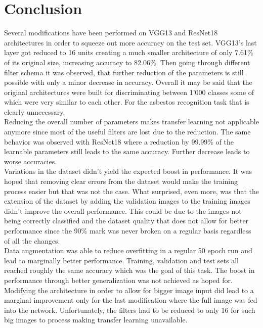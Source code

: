 \section{Conclusion}

Several modifications have been performed on VGG13 and ResNet18 architectures in order to squeeze out more accuracy on the test set. VGG13's last layer got reduced to 16 units creating a much smaller architecture of only 7.61\% of its original size, increasing accuracy to 82.06\%. Then going through different filter schema it was observed, that further reduction of the parameters is still possible with only a minor decrease in accuracy. Overall it may be said that the original architectures were built for discriminating between 1'000 classes some of which were very similar to each other. For the asbestos recognition task that is clearly unnecessary.\\

Reducing the overall number of parameters makes transfer learning not applicable anymore since most of the useful filters are lost due to the reduction. The same behavior was observed with ResNet18 where a reduction by 99.99\% of the learnable parameters still leads to the same accuracy. Further decrease leads to worse accuracies.\\

Variations in the dataset didn't yield the expected boost in performance. It was hoped that removing clear errors from the dataset would make the training process easier but that was not the case. What surprised, even more, was that the extension of the dataset by adding the validation images to the training images didn't improve the overall performance. This could be due to the images not being correctly classified and the dataset quality that does not allow for better performance since the 90\% mark was never broken on a regular basis regardless of all the changes.\\

Data augmentation was able to reduce overfitting in a regular 50 epoch run and lead to marginally better performance. Training, validation and test sets all reached roughly the same accuracy which was the goal of this task. The boost in performance through better generalization was not achieved as hoped for.\\

Modifying the architecture in order to allow for bigger image input did lead to a marginal improvement only for the last modification where the full image was fed into the network. Unfortunately, the filters had to be reduced to only 16 for such big images to process making transfer learning unavailable.

